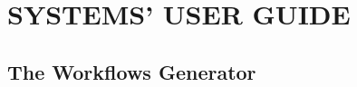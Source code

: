 \chapter{SYSTEMS' USER GUIDE}
\section{The Workflows Generator}
\label{app:workflows_generator_user_guide}
